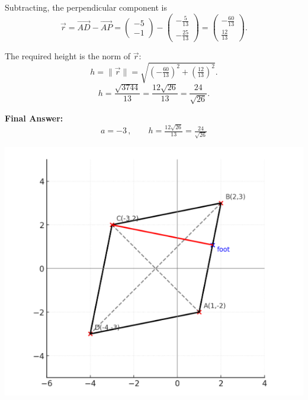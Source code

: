 \documentclass[journal]{IEEEtran}
\begin{document}
Subtracting, the perpendicular component is
\begin{equation}
\vec r=\vec{AD}-\vec{AP}
=\begin{pmatrix}-5\\-1\end{pmatrix}
-\begin{pmatrix}-\tfrac{5}{13}\\[4pt]-\tfrac{25}{13}\end{pmatrix}
=\begin{pmatrix}-\tfrac{60}{13}\\[4pt]\tfrac{12}{13}\end{pmatrix}.
\end{equation}

The required height is the norm of $\vec r$:
\begin{equation}
h=\|\vec r\|
=\sqrt{\left(-\tfrac{60}{13}\right)^2+\left(\tfrac{12}{13}\right)^2}.
\end{equation}
\begin{equation}
h=\frac{\sqrt{3744}}{13}
=\frac{12\sqrt{26}}{13}
=\frac{24}{\sqrt{26}}.
\end{equation}

\bigskip

\noindent
\textbf{Final Answer:}
\begin{equation}
\boxed{\,a=-3\,,\qquad h=\tfrac{12\sqrt{26}}{13}=\tfrac{24}{\sqrt{26}}\,}
\end{equation}
\bigskip

\begin{center}
    \includegraphics[width=0.8\columnwidth]{figs/fig4.png}
\end{center}
\end{document}
